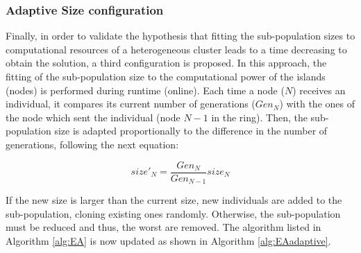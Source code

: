 \documentclass[final,1p,times]{elsarticle}
\begin{document}
\subsubsection{Adaptive Size configuration}



Finally, in order to validate the hypothesis that fitting the sub-population sizes to computational resources of a heterogeneous cluster leads to a time decreasing to obtain the solution, a third configuration is proposed. In this approach, the fitting of the sub-population size to the computational power of the islands (nodes) is performed during runtime (online).  Each time a node ($N$) receives an individual, it compares its current number of generations ($Gen_{N}$) with the ones of the node which sent the individual (node $N-1$ in the ring). Then, the sub-population size is adapted proportionally to the difference in the number of generations, following the next equation:

\begin{equation}
size'_{N}=\dfrac{Gen_{N}}{Gen_{N-1}}size_{N}
\end{equation}

If the new size is larger than the current size, new individuals are added to the sub-population, cloning  existing ones randomly. Otherwise, the sub-population must be reduced and thus, the worst are removed. The algorithm listed in Algorithm \ref{alg:EA} is now updated as shown in Algorithm \ref{alg:EAadaptive}.
\end{document}
